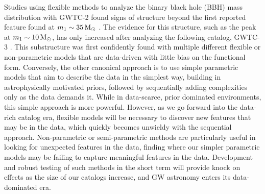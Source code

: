 Studies using flexible methods to analyze the binary black hole (BBH) mass distribution with GWTC-2 found signs of structure 
beyond the first reported feature found at $m_1\sim35\,{\rm M}_\odot$ \citep{Talbot_2018,o3a_pop,Tiwari_2021_b,Edelman_2022ApJ}. The evidence for this structure, 
such as the peak at $m_1\sim10\,{\rm M}_\odot$, has only increased after analyzing the following catalog, GWTC-3 \citep{o3b_astro_dist,Tiwari_2022ApJ}. 
This substructure was first confidently found with multiple different flexible or non-parametric models that are data-driven with little 
bias on the functional form. Conversely, the other canonical approach is to use simple parametric models that aim to describe the data
in the simplest way, building in astrophysically motivated priors, followed by sequentially adding complexities only as the data demands it. While in data-scarce, prior dominated
environments, this simple approach is more powerful. However, as we go forward into the data-rich catalog era, flexible models will be necessary to discover new features that may be in
the data, which quickly becomes unwieldy with the sequential approach. Non-parametric or semi-parametric methods are particularly useful in looking for unexpected features in the data, finding where 
our simpler parametric models may be failing to capture meaningful features in the data. Development and robust testing of such methods in the short term will provide
knock on effects as the size of our catalogs increase, and GW astronomy enters its data-dominated era. 

